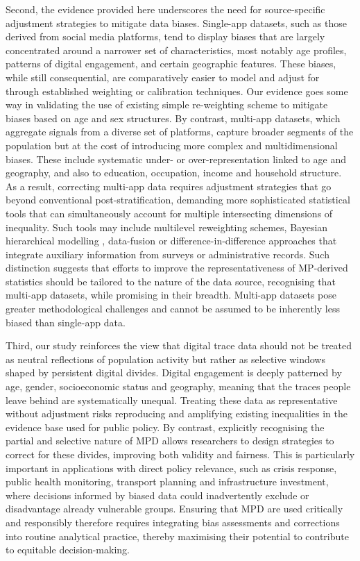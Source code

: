 \documentclass[]{rsos}%
\begin{document}
Second, the evidence provided here underscores the need for
source-specific adjustment strategies to mitigate data biases.
Single-app datasets, such as those derived from social media platforms,
tend to display biases that are largely concentrated around a narrower
set of characteristics, most notably age profiles, patterns of digital
engagement, and certain geographic features. These biases, while still
consequential, are comparatively easier to model and adjust for through
established weighting or calibration techniques. Our evidence goes some
way in validating the use of existing simple re-weighting scheme to
mitigate biases based on age and sex structures. By contrast, multi-app
datasets, which aggregate signals from a diverse set of platforms,
capture broader segments of the population but at the cost of
introducing more complex and multidimensional biases. These include
systematic under- or over-representation linked to age and geography,
and also to education, occupation, income and household structure. As a
result, correcting multi-app data requires adjustment strategies that go
beyond conventional post-stratification, demanding more sophisticated
statistical tools that can simultaneously account for multiple
intersecting dimensions of inequality. Such tools may include multilevel
reweighting schemes, Bayesian hierarchical modelling \citep{rampazzo2021a} ,
data-fusion \citep{graells-garrido2023} or difference-in-difference
approaches \citep{zagheni2012} that integrate auxiliary information from
surveys or administrative records. Such distinction suggests that
efforts to improve the representativeness of MP-derived statistics
should be tailored to the nature of the data source, recognising that
multi-app datasets, while promising in their breadth. Multi-app datasets
pose greater methodological challenges and cannot be assumed to be
inherently less biased than single-app data.

Third, our study reinforces the view that digital trace data should not
be treated as neutral reflections of population activity but rather as
selective windows shaped by persistent digital divides. Digital
engagement is deeply patterned by age, gender, socioeconomic status and
geography, meaning that the traces people leave behind are
systematically unequal. Treating these data as representative without
adjustment risks reproducing and amplifying existing inequalities in the
evidence base used for public policy. By contrast, explicitly
recognising the partial and selective nature of MPD allows researchers
to design strategies to correct for these divides, improving both
validity and fairness. This is particularly important in applications
with direct policy relevance, such as crisis response, public health
monitoring, transport planning and infrastructure investment, where
decisions informed by biased data could inadvertently exclude or
disadvantage already vulnerable groups. Ensuring that MPD are used
critically and responsibly therefore requires integrating bias
assessments and corrections into routine analytical practice, thereby
maximising their potential to contribute to equitable decision-making.
\end{document}
